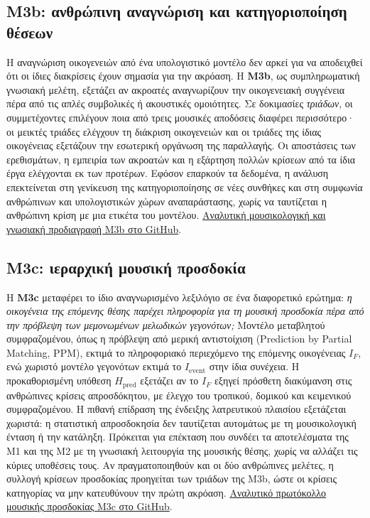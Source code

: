 \documentclass[a4paper]{article}
\begin{document}
\subsection{Μ3b: ανθρώπινη αναγνώριση και κατηγοριοποίηση θέσεων}\label{app:m3b}
Η αναγνώριση οικογενειών από ένα υπολογιστικό μοντέλο δεν αρκεί για να αποδειχθεί ότι οι ίδιες διακρίσεις έχουν σημασία για την ακρόαση. Η \textbf{Μ3b}, ως συμπληρωματική γνωσιακή μελέτη, εξετάζει αν ακροατές αναγνωρίζουν την οικογενειακή συγγένεια πέρα από τις απλές συμβολικές ή ακουστικές ομοιότητες. Σε δοκιμασίες \emph{τριάδων}, οι συμμετέχοντες επιλέγουν ποια από τρεις μουσικές αποδόσεις διαφέρει περισσότερο· οι μεικτές τριάδες ελέγχουν τη διάκριση οικογενειών και οι τριάδες της ίδιας οικογένειας εξετάζουν την εσωτερική οργάνωση της παραλλαγής. Οι αποστάσεις των ερεθισμάτων, η εμπειρία των ακροατών και η εξάρτηση πολλών κρίσεων από τα ίδια έργα ελέγχονται εκ των προτέρων. Εφόσον επαρκούν τα δεδομένα, η ανάλυση επεκτείνεται στη γενίκευση της κατηγοριοποίησης σε νέες συνθήκες και στη συμφωνία ανθρώπινων και υπολογιστικών χώρων αναπαράστασης, χωρίς να ταυτίζεται η ανθρώπινη κρίση με μια ετικέτα του μοντέλου. \href{https://github.com/GeorgeSpy/byz-position-phd-study/blob/main/docs/full/07-validation.md#r061}{Αναλυτική μουσικολογική και γνωσιακή προδιαγραφή Μ3b στο GitHub}.

\subsection{Μ3c: ιεραρχική μουσική προσδοκία}\label{app:m3c}
Η \textbf{Μ3c} μεταφέρει το ίδιο αναγνωρισμένο λεξιλόγιο σε ένα διαφορετικό ερώτημα: \emph{η οικογένεια της επόμενης θέσης παρέχει πληροφορία για τη μουσική προσδοκία πέρα από την πρόβλεψη των μεμονωμένων μελωδικών γεγονότων;} Μοντέλο μεταβλητού συμφραζομένου, όπως η πρόβλεψη από μερική αντιστοίχιση (Prediction by Partial Matching, PPM), εκτιμά το πληροφοριακό περιεχόμενο της επόμενης οικογένειας $I_F$, ενώ χωριστό μοντέλο γεγονότων εκτιμά το $I_{\mathrm{event}}$ στην ίδια συνέχεια. Η προκαθορισμένη υπόθεση $H_{\mathrm{pred}}$ εξετάζει αν το $I_F$ εξηγεί πρόσθετη διακύμανση στις ανθρώπινες κρίσεις απροσδόκητου, με έλεγχο του τροπικού, δομικού και κειμενικού συμφραζομένου. Η πιθανή επίδραση της ένδειξης λατρευτικού πλαισίου εξετάζεται χωριστά: η στατιστική απροσδοκησία δεν ταυτίζεται αυτομάτως με τη μουσικολογική ένταση ή την κατάληξη. Πρόκειται για επέκταση που συνδέει τα αποτελέσματα της Μ1 και της Μ2 με τη γνωσιακή λειτουργία της μουσικής θέσης, χωρίς να αλλάζει τις κύριες υποθέσεις τους. Αν πραγματοποιηθούν και οι δύο ανθρώπινες μελέτες, η συλλογή κρίσεων προσδοκίας προηγείται των τριάδων της Μ3b, ώστε οι κρίσεις κατηγορίας να μην κατευθύνουν την πρώτη ακρόαση. \href{https://github.com/GeorgeSpy/byz-position-phd-study/blob/main/docs/full/07-validation.md#r060}{Αναλυτικό πρωτόκολλο μουσικής προσδοκίας Μ3c στο GitHub}.
\end{document}
